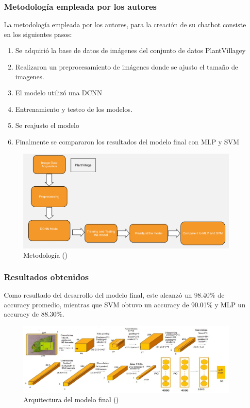 \subsubsection{Metodología empleada por los autores}
La metodología empleada por los autores, para la creación de su chatbot consiste en los siguientes pasos: 
\begin{enumerate}
	\item Se adquirió la base de datos de imágenes del conjunto de datos PlantVillagey
	\item Realizaron un preprocesamiento de imágenes donde se ajusto el tamaño de imagenes.
	\item El modelo utilizó una DCNN
	\item Entrenamiento y testeo de los modelos.
	\item Se reajusto el modelo
	\item Finalmente se compararon los resultados del modelo final con MLP y SVM
\end{enumerate}
\begin{figure}[H]
	\begin{center}
		\includegraphics[width=1\textwidth]{2/figures/ant5.jpg}
		\caption{Metodología (\cite{antecedente5})}
	\end{center}
\end{figure}

\subsubsection{Resultados obtenidos}
Como resultado del desarrollo del modelo final, este alcanzó un 98.40\% de accuracy promedio, mientras que SVM obtuvo un accuracy de 90.01\% y MLP un accuracy de 88.30\%. 

\begin{figure}[H]
	\begin{center}
		\includegraphics[width=1\textwidth]{2/figures/ant5.2.jpeg}
		\caption{Arquitectura del modelo final (\cite{antecedente5})}
	\end{center}
\end{figure}
